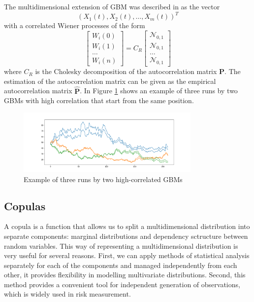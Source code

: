 \documentclass{article}
\begin{document}
The multidimensional extension of GBM was described in \cite{sabino2007monte} as the vector $$(X_1(t), X_2(t), \dots, X_m(t))^T$$ with a correlated Wiener processes of the form
\begin{equation*}
\begin{bmatrix}
    W_i(0)\\
    W_i(1)\\
    \dots \\
    W_i(n)
\end{bmatrix} = C_R \begin{bmatrix}
    \mathcal{N}_{0, 1}\\
    \mathcal{N}_{0, 1}\\
    \dots\\
    \mathcal{N}_{0, 1}
\end{bmatrix}
\end{equation*}
where $C_R$ is the Cholesky decomposition of the autocorrelation matrix $\mathbf P$. The estimation of the autocorrelation matrix can be given as the empirical autocorrelation matrix $\hat {\mathbf P}$. In Figure \ref{fig:gbm1} shows an example of three runs by two GBMs with high correlation that start from the same position.

\begin{figure}[ht!]
    \centering
    \includegraphics[width=0.8\textwidth]{pics/gbm.png}
    \caption{Example of three runs by two high-correlated GBMs}
    \label{fig:gbm1}
\end{figure}

\subsection{Copulas}
\label{section:copulas}

A copula is a function that allows us to split a multidimensional distribution into separate components: marginal distributions and dependency sctructure between random variables. This way of representing a multidimensional distribution is very useful for several reasons. First, we can apply methods of statistical analysis separately for each of the components and managed independently from each other, it provides flexibility in modelling multivariate distributions. Second, this method provides a convenient tool for independent generation of observations, which is widely used in risk measurement.
\end{document}
